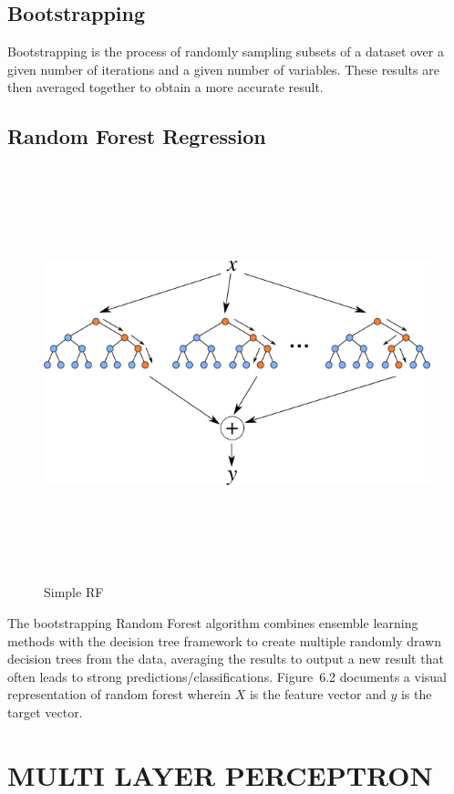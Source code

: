 \subsection{Bootstrapping}

Bootstrapping is the process of randomly sampling subsets of a dataset
over a given number of iterations and a given number of
variables. These results are then averaged together to obtain a more
accurate result.

\subsection{Random Forest Regression}

\begin{figure}[h]
\centering
\includegraphics[width=1\textwidth, height=12cm]{./figures/rf.png}
\caption{Simple RF}
\label{fig1}
\end{figure}

The bootstrapping Random Forest algorithm \cite{B} combines ensemble
learning methods with the decision tree framework to create multiple
randomly drawn decision trees from the data, averaging the results to
output a new result that often leads to strong
predictions/classifications. Figure~6.2 documents a visual
representation of random forest wherein $X$ is the feature
vector and $y$ is the target vector.

\section{MULTI LAYER PERCEPTRON}


